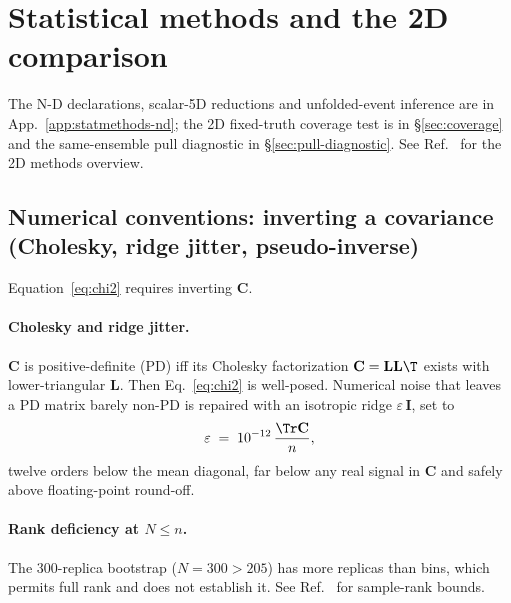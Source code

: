 \section{Statistical methods and the 2D comparison}
\label{app:statmethods}
\label{app:methods}

The N-D declarations, scalar-5D reductions and unfolded-event inference are in App.~\ref{app:statmethods-nd}; the 2D fixed-truth coverage test is in \S\ref{sec:coverage} and the same-ensemble pull diagnostic in \S\ref{sec:pull-diagnostic}. See Ref.~\cite{NoteRecords2026} for the 2D methods overview.

\subsection{Numerical conventions: inverting a covariance (Cholesky, ridge jitter, pseudo-inverse)}
\label{sec:invert}

Equation~\eqref{eq:chi2} requires inverting $\mathbf{C}$.

\paragraph{Cholesky and ridge jitter.} $\mathbf{C}$ is positive-definite (PD) iff its Cholesky factorization $\mathbf{C}=\mathbf{L}\mathbf{L}\T$ exists with lower-triangular $\mathbf{L}$. Then Eq.~\eqref{eq:chi2} is well-posed. Numerical noise that leaves a PD matrix barely non-PD is repaired with an isotropic ridge $\varepsilon\,\mathbf{I}$, set to
\begin{equation}
\varepsilon \;=\; 10^{-12} \,\frac{\Tr\mathbf{C}}{n},
\end{equation}
twelve orders below the mean diagonal, far below any real signal in $\mathbf{C}$ and safely above floating-point round-off.

\paragraph{Rank deficiency at $N \le n$.} The 300-replica bootstrap ($N=300 > 205$) has more replicas than bins, which permits full rank and does not establish it. See Ref.~\cite{NoteRecords2026} for sample-rank bounds.

